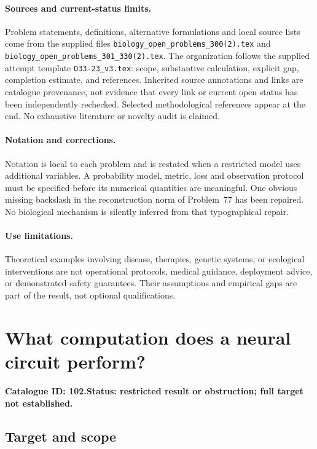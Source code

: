 \documentclass[11pt]{article}
\begin{document}
\paragraph{Sources and current-status limits.}
Problem statements, definitions, alternative formulations and local source lists
come from the supplied files
\texttt{biology\_open\_problems\_300(2).tex} and
\texttt{biology\_open\_problems\_301\_330(2).tex}.
The organization follows the supplied attempt template
\texttt{O33-23\_v3.tex}: scope, substantive calculation, explicit gap,
completion estimate, and references. Inherited source annotations and links are
catalogue provenance, not evidence that every link or current open status has
been independently rechecked. Selected methodological references appear at the
end. No exhaustive literature or novelty audit is claimed.

\paragraph{Notation and corrections.}
Notation is local to each problem and is restated when a restricted model uses
additional variables. A probability model, metric, loss and observation protocol
must be specified before its numerical quantities are meaningful. One obvious
missing backslash in the reconstruction norm of Problem~77 has been repaired.
No biological mechanism is silently inferred from that typographical repair.

\paragraph{Use limitations.}
Theoretical examples involving disease, therapies, genetic systems, or ecological
interventions are not operational protocols, medical guidance, deployment advice,
or demonstrated safety guarantees. Their assumptions and empirical gaps are part
of the result, not optional qualifications.

\setcounter{section}{101}
\section{What computation does a neural circuit perform?}
\label{prob:102}
\noindent\textbf{Catalogue ID: 102.}\quad \textbf{Status: restricted result or obstruction; full target not established.}
\subsection{Target and scope}
\end{document}

